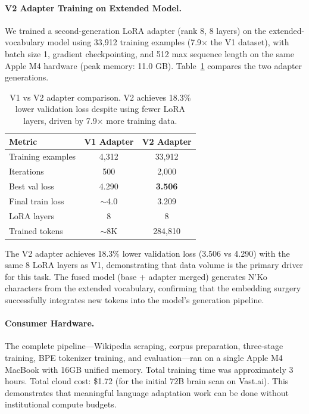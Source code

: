\documentclass[11pt]{article}
\begin{document}
\paragraph{V2 Adapter Training on Extended Model.}
We trained a second-generation LoRA adapter (rank 8, 8 layers) on the extended-vocabulary model using 33,912 training examples (7.9$\times$ the V1 dataset), with batch size 1, gradient checkpointing, and 512 max sequence length on the same Apple M4 hardware (peak memory: 11.0 GB).
Table~\ref{tab:v2-results} compares the two adapter generations.

\begin{table}[t]
\centering
\small
\begin{tabular}{lcc}
\toprule
\textbf{Metric} & \textbf{V1 Adapter} & \textbf{V2 Adapter} \\
\midrule
Training examples & 4,312 & 33,912 \\
Iterations & 500 & 2,000 \\
Best val loss & 4.290 & \textbf{3.506} \\
Final train loss & $\sim$4.0 & 3.209 \\
LoRA layers & 8 & 8 \\
Trained tokens & $\sim$8K & 284,810 \\
\bottomrule
\end{tabular}
\caption{V1 vs V2 adapter comparison. V2 achieves 18.3\% lower validation loss despite using fewer LoRA layers, driven by 7.9$\times$ more training data.}
\label{tab:v2-results}
\end{table}

The V2 adapter achieves 18.3\% lower validation loss (3.506 vs 4.290) with the same 8 LoRA layers as V1, demonstrating that data volume is the primary driver for this task.
The fused model (base + adapter merged) generates N'Ko characters from the extended vocabulary, confirming that the embedding surgery successfully integrates new tokens into the model's generation pipeline.

\paragraph{Consumer Hardware.}
The complete pipeline---Wikipedia scraping, corpus preparation, three-stage training, BPE tokenizer training, and evaluation---ran on a single Apple M4 MacBook with 16GB unified memory.
Total training time was approximately 3 hours.
Total cloud cost: \$1.72 (for the initial 72B brain scan on Vast.ai).
This demonstrates that meaningful language adaptation work can be done without institutional compute budgets.
\end{document}
